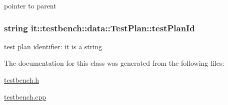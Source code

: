 pointer to parent \hypertarget{classit_1_1testbench_1_1data_1_1TestPlan_aafc66e80e83fa15da6a4b725f8008667}{
\subsubsection[{test\-Plan\-Id}]{\setlength{\rightskip}{0pt plus 5cm}string it\-::testbench\-::data\-::\-Test\-Plan\-::test\-Plan\-Id\hspace{0.3cm}{\ttfamily [private]}}}\label{db/d7b/classit_1_1testbench_1_1data_1_1TestPlan_aafc66e80e83fa15da6a4b725f8008667}
test plan identifier\-: it is a string 

The documentation for this class was generated from the following files\-:\begin{DoxyCompactItemize}
\item 
\hyperlink{testbench_8h}{testbench.\-h}\item 
\hyperlink{testbench_8cpp}{testbench.\-cpp}\end{DoxyCompactItemize}
